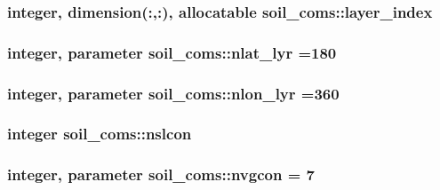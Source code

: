 \subsubsection[{\texorpdfstring{layer\+\_\+index}{layer_index}}]{\setlength{\rightskip}{0pt plus 5cm}integer, dimension(\+:,\+:), allocatable soil\+\_\+coms\+::layer\+\_\+index}\hypertarget{namespacesoil__coms_a09e8408810b16557b7bcc84cd165645a}{}\label{namespacesoil__coms_a09e8408810b16557b7bcc84cd165645a}
\subsubsection[{\texorpdfstring{nlat\+\_\+lyr}{nlat_lyr}}]{\setlength{\rightskip}{0pt plus 5cm}integer, parameter soil\+\_\+coms\+::nlat\+\_\+lyr =180}\hypertarget{namespacesoil__coms_ab0f3f3665b8b408861fcded1094fa91c}{}\label{namespacesoil__coms_ab0f3f3665b8b408861fcded1094fa91c}
\subsubsection[{\texorpdfstring{nlon\+\_\+lyr}{nlon_lyr}}]{\setlength{\rightskip}{0pt plus 5cm}integer, parameter soil\+\_\+coms\+::nlon\+\_\+lyr =360}\hypertarget{namespacesoil__coms_a8430352c5e4200574649e445fbe0e682}{}\label{namespacesoil__coms_a8430352c5e4200574649e445fbe0e682}
\subsubsection[{\texorpdfstring{nslcon}{nslcon}}]{\setlength{\rightskip}{0pt plus 5cm}integer soil\+\_\+coms\+::nslcon}\hypertarget{namespacesoil__coms_a461eb2939beb7809ce27cce9b68cb38f}{}\label{namespacesoil__coms_a461eb2939beb7809ce27cce9b68cb38f}
\subsubsection[{\texorpdfstring{nvgcon}{nvgcon}}]{\setlength{\rightskip}{0pt plus 5cm}integer, parameter soil\+\_\+coms\+::nvgcon = 7}\hypertarget{namespacesoil__coms_aae84e5a9fa25d15c1b11e7e3e9c8c35d}{}\label{namespacesoil__coms_aae84e5a9fa25d15c1b11e7e3e9c8c35d}
